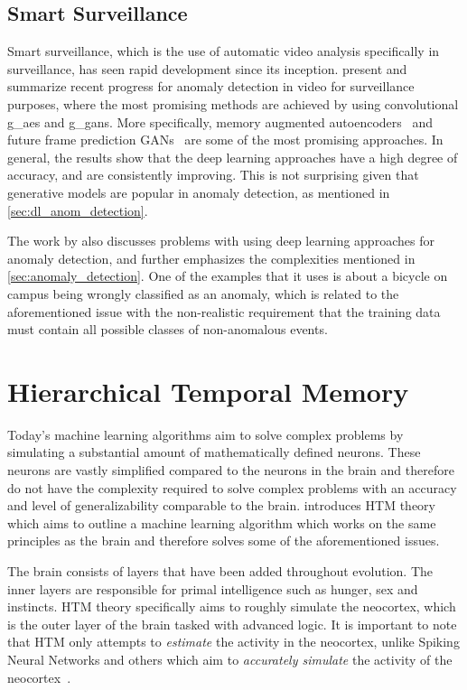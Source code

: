 \subsection{Smart Surveillance}
Smart surveillance, which is the use of automatic video analysis specifically in surveillance, has seen rapid development since its inception. \textcite{anomalyvideo, smart_surveillance_2} present and summarize recent progress for anomaly detection in video for surveillance purposes, where the most promising methods are achieved by using convolutional \glspl*{g_ae} and \glspl*{g_gan}. More specifically, memory augmented autoencoders~\cite{memae} and future frame prediction GANs~\cite{future_frame_prediction} are some of the most promising approaches. In general, the results show that the deep learning approaches have a high degree of accuracy, and are consistently improving. This is not surprising given that generative models are popular in anomaly detection, as mentioned in \autoref{sec:dl_anom_detection}.
\par
The work by \textcite{anomalyvideo} also discusses problems with using deep learning approaches for anomaly detection, and further emphasizes the complexities mentioned in \autoref{sec:anomaly_detection}. One of the examples that it uses is about a bicycle on campus being wrongly classified as an anomaly, which is related to the aforementioned issue with the non-realistic requirement that the training data must contain all possible classes of non-anomalous events.

\section{Hierarchical Temporal Memory}
Today's machine learning algorithms aim to solve complex problems by simulating a substantial amount of mathematically defined neurons. These neurons are vastly simplified compared to the neurons in the brain and therefore do not have the complexity required to solve complex problems with an accuracy and level of generalizability comparable to the brain. \textcite{BAMI} introduces HTM theory which aims to outline a machine learning algorithm which works on the same principles as the brain and therefore solves some of the aforementioned issues.\par
The brain consists of layers that have been added throughout evolution. The inner layers are responsible for primal intelligence such as hunger, sex and instincts. HTM theory specifically aims to roughly simulate the neocortex, which is the outer layer of the brain tasked with advanced logic. It is important to note that HTM only attempts to \emph{estimate} the activity in the neocortex, unlike Spiking Neural Networks and others which aim to \emph{accurately simulate} the activity of the neocortex~\cite{spiking_neural_networks}.
